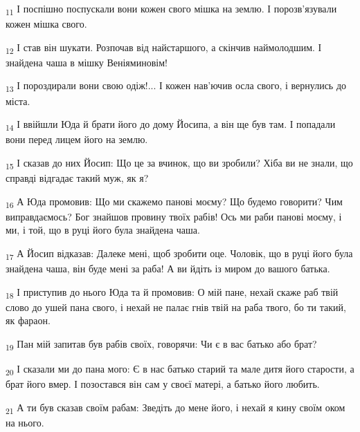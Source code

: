 \begin{tcolorbox}
\textsubscript{11} І поспішно поспускали вони кожен свого мішка на землю. І порозв'язували кожен мішка свого.
\end{tcolorbox}
\begin{tcolorbox}
\textsubscript{12} І став він шукати. Розпочав від найстаршого, а скінчив наймолодшим. І знайдена чаша в мішку Веніяминовім!
\end{tcolorbox}
\begin{tcolorbox}
\textsubscript{13} І пороздирали вони свою одіж!... І кожен нав'ючив осла свого, і вернулись до міста.
\end{tcolorbox}
\begin{tcolorbox}
\textsubscript{14} І ввійшли Юда й брати його до дому Йосипа, а він ще був там. І попадали вони перед лицем його на землю.
\end{tcolorbox}
\begin{tcolorbox}
\textsubscript{15} І сказав до них Йосип: Що це за вчинок, що ви зробили? Хіба ви не знали, що справді відгадає такий муж, як я?
\end{tcolorbox}
\begin{tcolorbox}
\textsubscript{16} А Юда промовив: Що ми скажемо панові моєму? Що будемо говорити? Чим виправдаємось? Бог знайшов провину твоїх рабів! Ось ми раби панові моєму, і ми, і той, що в руці його була знайдена чаша.
\end{tcolorbox}
\begin{tcolorbox}
\textsubscript{17} А Йосип відказав: Далеке мені, щоб зробити оце. Чоловік, що в руці його була знайдена чаша, він буде мені за раба! А ви йдіть із миром до вашого батька.
\end{tcolorbox}
\begin{tcolorbox}
\textsubscript{18} І приступив до нього Юда та й промовив: О мій пане, нехай скаже раб твій слово до ушей пана свого, і нехай не палає гнів твій на раба твого, бо ти такий, як фараон.
\end{tcolorbox}
\begin{tcolorbox}
\textsubscript{19} Пан мій запитав був рабів своїх, говорячи: Чи є в вас батько або брат?
\end{tcolorbox}
\begin{tcolorbox}
\textsubscript{20} І сказали ми до пана мого: Є в нас батько старий та мале дитя його старости, а брат його вмер. І позостався він сам у своєї матері, а батько його любить.
\end{tcolorbox}
\begin{tcolorbox}
\textsubscript{21} А ти був сказав своїм рабам: Зведіть до мене його, і нехай я кину своїм оком на нього.
\end{tcolorbox}
